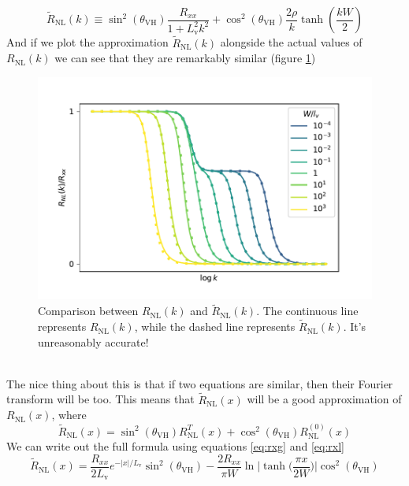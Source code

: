 \begin{equation}
    \tilde R_{\textrm{NL}}(k)\equiv
    \sin^2(\theta_{\textrm{VH}})\frac {R_{xx}}{1+L_\textrm{v}^2k^2}+
    \cos^2(\theta_{\textrm{VH}})\frac {2\rho}{k}\tanh\left(\frac{kW}2\right)
\end{equation}
And if we plot the approximation $\tilde R_{\textrm{NL}}(k)$ alongside the actual values of $R_{\textrm{NL}}(k)$ we can see that they are remarkably similar (figure \ref{fig:kapproxcomp})
\begin{figure}[h!]
    \centering
    \includegraphics[width=\linewidth]{Immagini/rnl/kapproxcomp.pdf}
    \caption{Comparison between $R_{\textrm{NL}}(k)$ and $\tilde R_{\textrm{NL}}(k)$. The continuous line represents $R_{\textrm{NL}}(k)$, while the dashed line represents $\tilde R_{\textrm{NL}}(k)$. It's unreasonably accurate!}
    \label{fig:kapproxcomp}
\end{figure}\\
The nice thing about this is that if two equations are similar, then their Fourier transform will be too.
This means that $\tilde R_{\textrm{NL}}(x)$ will be a good approximation of $R_{\textrm{NL}}(x)$, where
\begin{equation}
    \boxed{
        \tilde R_{\textrm{NL}}(x)=
        \sin^2(\theta_{\textrm{VH}})R_{\textrm{NL}}^T(x)+
        \cos^2(\theta_{\textrm{VH}})R_{\textrm{NL}}^{(0)}(x)
    }
    \label{eq:rnl}
\end{equation}
We can write out the full formula using equations \ref{eq:rxg} and \ref{eq:rxl}
\begin{equation}
    \tilde R_{\textrm{NL}}(x)=
    \frac{R_{xx}}{2L_\textrm{v}}e^{-|x|/L_\textrm{v}}\sin^2(\theta_{\textrm{VH}})-
    \frac{2R_{xx}}{\pi W}\ln \bigg|\tanh \Big(\frac{\pi x}{2W}\Big)\bigg|\cos^2(\theta_{\textrm{VH}})
\end{equation}
